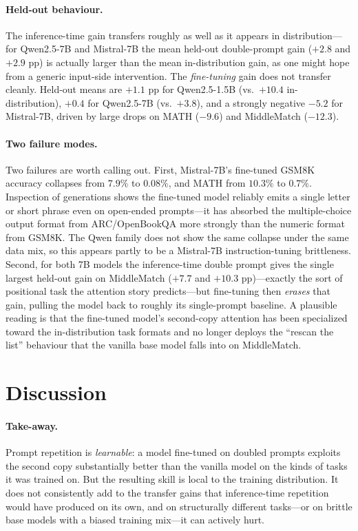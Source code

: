 \documentclass{article}
\begin{document}
\paragraph{Held-out behaviour.}
The inference-time gain transfers roughly as well as it appears in
distribution---for Qwen2.5-7B and Mistral-7B the mean held-out
double-prompt gain ($+2.8$ and $+2.9$ pp) is actually larger than the
mean in-distribution gain, as one might hope from a generic
input-side intervention. The \emph{fine-tuning} gain does not
transfer cleanly. Held-out means are $+1.1$ pp for Qwen2.5-1.5B
(vs.\ $+10.4$ in-distribution), $+0.4$ for Qwen2.5-7B (vs.\ $+3.8$),
and a strongly negative $-5.2$ for Mistral-7B, driven by large drops on
MATH ($-9.6$) and MiddleMatch ($-12.3$).

\paragraph{Two failure modes.}
Two failures are worth calling out. First, Mistral-7B's fine-tuned
GSM8K accuracy collapses from $7.9\%$ to $0.08\%$, and MATH from
$10.3\%$ to $0.7\%$. Inspection of generations shows the fine-tuned
model reliably emits a single letter or short phrase even on
open-ended prompts---it has absorbed the multiple-choice output format
from ARC/OpenBookQA more strongly than the numeric format from GSM8K.
The Qwen family does not show the same collapse under the same data
mix, so this appears partly to be a Mistral-7B instruction-tuning
brittleness. Second, for both 7B models the inference-time double
prompt gives the single largest held-out gain on MiddleMatch ($+7.7$
and $+10.3$ pp)---exactly the sort of positional task the attention
story predicts---but fine-tuning then \emph{erases} that gain, pulling
the model back to roughly its single-prompt baseline. A plausible
reading is that the fine-tuned model's second-copy attention has been
specialized toward the in-distribution task formats and no longer
deploys the ``rescan the list'' behaviour that the vanilla base model
falls into on MiddleMatch.


\section{Discussion}

\paragraph{Take-away.}
Prompt repetition is \emph{learnable}: a model fine-tuned on doubled
prompts exploits the second copy substantially better than the vanilla
model on the kinds of tasks it was trained on. But the resulting skill
is local to the training distribution. It does not consistently add to
the transfer gains that inference-time repetition would have produced
on its own, and on structurally different tasks---or on brittle base
models with a biased training mix---it can actively hurt.
\end{document}
